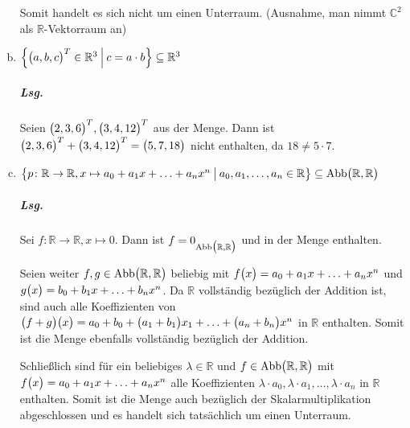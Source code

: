 \documentclass{scrreprt}
\begin{document}
\begin{enumerate}[(a)]
  Somit handelt es sich nicht um einen Unterraum.
  (Ausnahme, man nimmt $\mathbb{C}^2$ als $\mathbb{R}$-Vektorraum an)

\item $\qty{\qty\big(a, b, c)^T \in \mathbb{R}^3 \:\middle|\: c = a \cdot b} \subseteq \mathbb{R}^3$

  \subparagraph{Lsg.} Seien $\qty\big(2, 3, 6)^T, \qty\big(3, 4, 12)^T$ aus der
  Menge.
  Dann ist $\qty\big(2, 3, 6)^T + \qty\big(3, 4, 12)^T = \qty\big(5, 7, 18)$
  nicht enthalten, da $18 \ne 5 \cdot 7$.

\item $\qty\big{p \colon \mathbb{R} \to \mathbb{R}, x \mapsto a_0 + a_1x + \ldots + a_nx^n \:\big|\: a_0, a_1, \ldots, a_n \in \mathbb{R}} \subseteq \text{Abb}\qty\big(\mathbb{R}, \mathbb{R})$

  \subparagraph{Lsg.} Sei $f \colon \mathbb{R} \to \mathbb{R}, x \mapsto 0$.
  Dann ist $f = 0_{\text{Abb}\qty\big(\mathbb{R}, \mathbb{R})}$ und in der Menge
  enthalten.

  Seien weiter $f, g \in \text{Abb}\qty\big(\mathbb{R}, \mathbb{R})$ beliebig
  mit $f\qty\big(x) = a_0 + a_1x + \ldots + a_nx^n$ und
  $g\qty\big(x) = b_0 + b_1x + \ldots + b_nx^n$.
  Da $\mathbb{R}$ vollständig bezüglich der Addition ist, sind auch alle
  Koeffizienten von
  $\qty\big(f + g)\qty\big(x) = a_0 + b_0 + \qty\big(a_1 + b_1)x_1 + \ldots + \qty\big(a_n + b_n)x^n$
  in $\mathbb{R}$ enthalten.
  Somit ist die Menge ebenfalls vollständig bezüglich der Addition.

  Schließlich sind für ein beliebiges $\lambda \in \mathbb{R}$ und
  $f \in \text{Abb}\qty\big(\mathbb{R}, \mathbb{R})$
  mit $f\qty\big(x) = a_0 + a_1x + \ldots + a_nx^n$
  alle Koeffizienten $\lambda \cdot a_0, \lambda \cdot a_1, \ldots, \lambda \cdot a_n$
  in $\mathbb{R}$ enthalten.
  Somit ist die Menge auch bezüglich der Skalarmultiplikation abgeschlossen
  und es handelt sich tatsächlich um einen Unterraum.
\end{enumerate}
\end{document}
